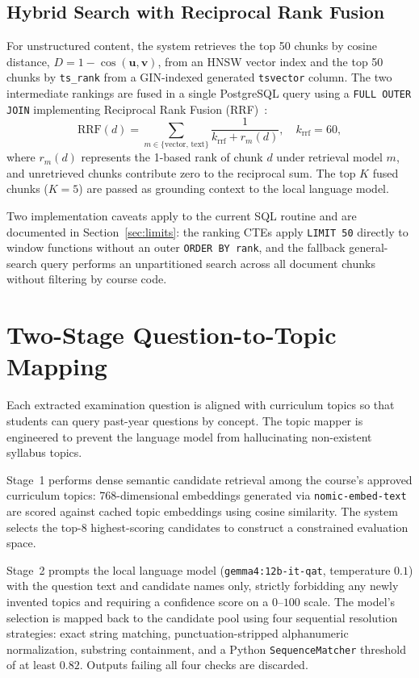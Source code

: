 \documentclass[conference]{IEEEtran}
\begin{document}
\subsection{Hybrid Search with Reciprocal Rank Fusion}
For unstructured content, the system retrieves the top 50 chunks by cosine distance, $D = 1-\cos(\mathbf{u},\mathbf{v})$, from an HNSW vector index and the top 50 chunks by \texttt{ts\_rank} from a GIN-indexed generated \texttt{tsvector} column. The two intermediate rankings are fused in a single PostgreSQL query using a \texttt{FULL OUTER JOIN} implementing Reciprocal Rank Fusion (RRF)~\cite{cormack2009}:
\begin{equation}
\mathrm{RRF}(d) = \sum_{m \in \{\mathrm{vector},\,\mathrm{text}\}} \frac{1}{k_{\mathrm{rrf}} + r_m(d)}, \quad k_{\mathrm{rrf}} = 60,
\end{equation}
where $r_m(d)$ represents the 1-based rank of chunk $d$ under retrieval model $m$, and unretrieved chunks contribute zero to the reciprocal sum. The top $K$ fused chunks ($K = 5$) are passed as grounding context to the local language model. 

Two implementation caveats apply to the current SQL routine and are documented in Section~\ref{sec:limits}: the ranking CTEs apply \texttt{LIMIT 50} directly to window functions without an outer \texttt{ORDER BY rank}, and the fallback general-search query performs an unpartitioned search across all document chunks without filtering by course code.


\section{Two-Stage Question-to-Topic Mapping}\label{sec:mapping}
Each extracted examination question is aligned with curriculum topics so that students can query past-year questions by concept. The topic mapper is engineered to prevent the language model from hallucinating non-existent syllabus topics.

Stage~1 performs dense semantic candidate retrieval among the course's approved curriculum topics: 768-dimensional embeddings generated via \texttt{nomic-embed-text} are scored against cached topic embeddings using cosine similarity. The system selects the top-8 highest-scoring candidates to construct a constrained evaluation space.

Stage~2 prompts the local language model (\texttt{gemma4:12b-it-qat}, temperature $0.1$) with the question text and candidate names only, strictly forbidding any newly invented topics and requiring a confidence score on a $0$--$100$ scale. The model's selection is mapped back to the candidate pool using four sequential resolution strategies: exact string matching, punctuation-stripped alphanumeric normalization, substring containment, and a Python \texttt{SequenceMatcher} threshold of at least $0.82$. Outputs failing all four checks are discarded.
\end{document}
